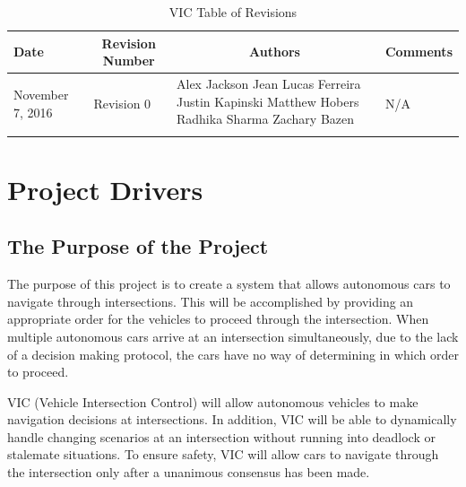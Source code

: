\documentclass [12pt]{article}
\begin{document}
\thispagestyle{empty}
\begin{longtable}{| p{ } | p{ } | p{ } | p{ } |}

\hline 
\centering \textbf{Date} & 
\multicolumn{1}{c}{\textbf {Revision Number}} &
\multicolumn{1}{|c}{\textbf {Authors}} & 
\multicolumn{1}{|c|}{\textbf {Comments}} \\ \hline

\multirow{4}{*}{\centering November 7, 2016}  & 
\multirow{4}{*}{Revision 0}& 
{Alex Jackson \newline
Jean Lucas Ferreira \newline
Justin Kapinski\newline
Matthew Hobers\newline
Radhika Sharma\newline
Zachary Bazen}
&
 \multirow{4}{*}{N/A} \\ 
\hline 

\caption{VIC Table of Revisions} 
\end{longtable}
\pagebreak



\section {\textbf{Project Drivers}}


\subsection{The Purpose of the Project} 
The purpose of this project is to create a system that allows autonomous cars to navigate through  intersections. This will be accomplished by providing an appropriate order for the vehicles to proceed through the intersection. When multiple autonomous cars arrive at an intersection simultaneously, due to the lack of a decision making protocol, the cars have no way of determining in which order to proceed. \newline


VIC (Vehicle Intersection Control) will allow autonomous vehicles to make navigation decisions at intersections. In addition, VIC will be able to dynamically handle changing scenarios at an intersection without running into deadlock or stalemate situations. To ensure safety, VIC will allow cars to navigate through the intersection only after a unanimous consensus has been made. \newline
\end{document}
